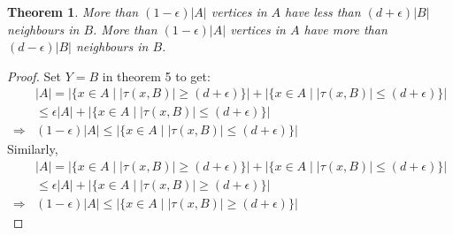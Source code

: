 \documentclass{article}
\newtheorem{theorem}{Theorem}[]
\begin{document}
\begin{theorem}
	More than $(1-\epsilon)|A|$ vertices in $A$ have less than $(d+\epsilon)|B|$ neighbours in $B$. More than $(1-\epsilon)|A|$ vertices in $A$ have more than $(d-\epsilon)|B|$ neighbours in $B$.
\end{theorem}
\begin{proof}
	Set $Y=B$ in theorem 5 to get:
	\begin{align}
			&|A|=|\{x\in A\mid|\tau(x,B)|\geq  (d+\epsilon)\}|+|\{x\in A\mid|\tau(x,B)|	\leq  (d+\epsilon)\}|\nonumber\\
			&\leq  \epsilon|A|+|\{x\in A\mid|\tau(x,B)|\leq  (d+\epsilon)\}|\nonumber\\ 
			\Rightarrow &(1-\epsilon)|A|\leq |\{x\in A\mid|\tau(x,B)|\leq  (d+\epsilon)\}|
	\end{align}
	Similarly,
	\begin{align}
			&|A|=|\{x\in A\mid|\tau(x,B)|\geq  (d+\epsilon)\}|+|\{x\in A\mid|\tau(x,B)|	\leq  (d+\epsilon)\}|\nonumber\\
			&\leq  \epsilon|A|+|\{x\in A\mid|\tau(x,B)|\geq  (d+\epsilon)\}|\nonumber\\ 
			\Rightarrow &(1-\epsilon)|A|\leq |\{x\in A\mid|\tau(x,B)|\geq  (d+\epsilon)\}|
	\end{align}
\end{proof}
\end{document}
